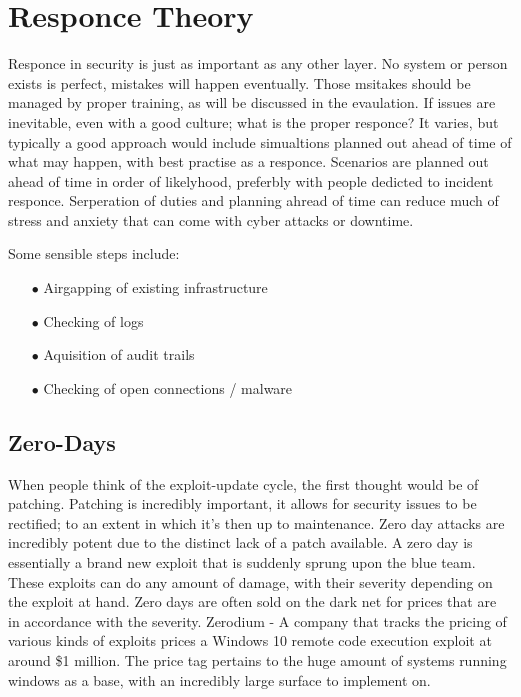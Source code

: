 
\section{Responce Theory}
Responce in security is just as important as any other layer. No system or person exists is perfect, mistakes will happen eventually. Those msitakes should be managed by proper training, as will be discussed in the evaulation.
If issues are inevitable, even with a good culture; what is the proper responce? It varies, but typically a good approach would include simualtions planned out ahead of time of what may happen, with best practise as a responce.
Scenarios are planned out ahead of time in order of likelyhood, preferbly with people dedicted to incident responce. Serperation of duties and planning ahread of time can reduce much of stress and anxiety that can come with cyber attacks or downtime.

Some sensible steps include:
\begin{enumerate}
    \item [$\bullet$] Airgapping of existing infrastructure
    \item [$\bullet$] Checking of logs
    \item [$\bullet$] Aquisition of audit trails
    \item [$\bullet$] Checking of open connections / malware
\end{enumerate}


\subsection{Zero-Days}
When people think of the exploit-update cycle, the first thought would be of patching. Patching is incredibly important, it allows for security issues to be rectified; to an extent in which it's then up to maintenance. Zero day attacks are incredibly 
potent due to the distinct lack of a patch available. A zero day is essentially a brand new exploit that is suddenly sprung upon the blue team. These exploits can do any amount of damage, with their severity depending on the exploit at hand. 
Zero days are often sold on the dark net for prices that are in accordance with the severity. Zerodium - A company that tracks the pricing of various kinds of exploits prices a Windows 10 remote code execution exploit at around \$1 million. 
The price tag pertains to the huge amount of systems running windows as a base, with an incredibly large surface to implement on.

